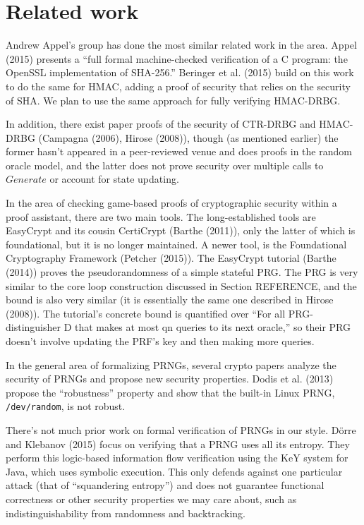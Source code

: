 \documentclass[12pt,lot, lof]{puthesis}
\begin{document}
\section{Related work} \label{sec:related_work}

Andrew Appel's group has done the most similar related work in the area. Appel (2015) presents a ``full formal machine-checked verification of a C program: the OpenSSL implementation of SHA-256.'' Beringer et al. (2015) build on this work to do the same for HMAC, adding a proof of security that relies on the security of SHA. We plan to use the same approach for fully verifying HMAC-DRBG. 

In addition, there exist paper proofs of the security of CTR-DRBG and HMAC-DRBG (Campagna (2006), Hirose (2008)), though (as mentioned earlier) the former hasn't appeared in a peer-reviewed venue and does proofs in the random oracle model, and the latter does not prove security over multiple calls to $Generate$ or account for state updating.

In the area of checking game-based proofs of cryptographic security within a proof assistant, there are two main tools. The long-established tools are EasyCrypt and its cousin CertiCrypt (Barthe (2011)), only the latter of which is foundational, but it is no longer maintained. A newer tool, is the Foundational Cryptography Framework (Petcher (2015)). The EasyCrypt tutorial (Barthe (2014)) proves the pseudorandomness of a simple stateful PRG. The PRG is very similar to the core loop construction discussed in Section REFERENCE, and the bound is also very similar (it is essentially the same one described in Hirose (2008)). The tutorial's concrete bound is quantified over ``For all PRG-distinguisher D that makes at most qn queries to its next oracle,'' so their PRG doesn't involve updating the PRF's key and then making more queries.

In the general area of formalizing PRNGs, several crypto papers analyze the security of PRNGs and propose new security properties. Dodis et al. (2013) propose the ``robustness'' property and show that the built-in Linux PRNG, \texttt{/dev/random}, is not robust.

There's not much prior work on formal verification of PRNGs in our style. D{\"o}rre and Klebanov (2015)  focus on verifying that a PRNG uses all its entropy. They perform this logic-based information flow verification using the KeY system for Java, which uses symbolic execution. This only defends against one particular attack (that of ``squandering entropy'') and does not guarantee functional correctness or other security properties we may care about, such as indistinguishability from randomness and backtracking.
\end{document}
